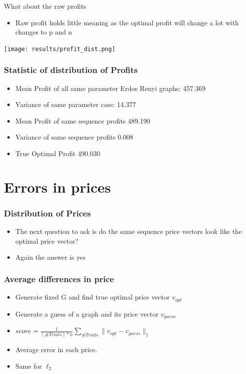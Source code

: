 \documentclass[a4paper,12pt]{beamer}
\begin{document}
\begin{frame}{What about the raw profits}
  \begin{itemize}
    \item Raw profit holds little meaning as the optimal profit will change a lot with changes to p and n \\
  \end{itemize}

  \texttt{[image: results/profit\_dist.png]}
  \end{frame}

\begin{frame}
  \frametitle{Statistic of distribution of Profits}
  \begin{itemize}
    \item Mean Profit of all same parameter Erdos Renyi graphs: 457.369\\
    \item Variance of same parameter case: 14.377
    \item Mean Profit of same sequence profits 489.190
    \item Variance of same sequence profits 0.008
    \item True Optimal Profit 490.030
  \end{itemize}
\end{frame}


\section{Errors in prices}
\begin{frame}
  \frametitle{Distribution of Prices}
  \begin{itemize}
    \item The next question to ask is do the same sequence price vectors look like the optimal price vector?
    \item Again the answer is yes
  \end{itemize}
\end{frame}

\begin{frame}
  \frametitle{Average  differences in price }
  \begin{itemize}
    \item Generate fixed G and find true optimal price vector $v_{opt}$
    \item Generate a guess of a graph and its price vector $v_{guess}$
    \item $score = \frac{1}{(\# Trials)*n}\sum_{\# Trials} \| v_{opt} - v_{guess}\|_{1} $
    \item Average error in each price.
    \item Same for $\ell_{2}$
  \end{itemize}
\end{frame}
\end{document}
